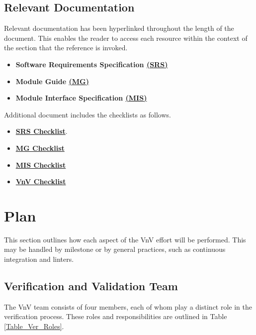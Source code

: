 \documentclass[12pt, titlepage]{article}
\begin{document}
\subsection{Relevant Documentation}
Relevant documentation has been hyperlinked throughout the length of the document. This enables 
the reader to access each resource within the context of the section that the reference is invoked.
\begin{itemize}
\item \textbf{Software Requirements Specification \href{https://github.com/KiranSingh15/CAS-741-Image-Correspondences/blob/main/docs/SRS/SRS.pdf}
{(SRS)}}
\item \textbf{Module Guide \href{https://github.com/KiranSingh15/CAS-741-Image-Correspondences/blob/main/docs/Design/SoftArchitecture/MG.pdf}
{(MG)}} 
\item 
\textbf{Module Interface Specification \href{https://github.com/KiranSingh15/CAS-741-Image-Correspondences/blob/main/docs/Design/SoftDetailedDes/MIS.pdf}{(MIS)}}
\end{itemize}

Additional document includes the checklists as follows.
\begin{itemize}
\item \textbf{\href{https://github.com/KiranSingh15/CAS-741-Image-Correspondences/blob/
main/docs/Checklists/SRS-Checklist.pdf}
{SRS Checklist}}. 
\item \textbf{\href{https://github.com/KiranSingh15/CAS-741-Image-Correspondences/blob/main/docs/Checklists/MG-Checklist.pdf}
{MG Checklist}} 
\item \textbf{\href{https://github.com/KiranSingh15/CAS-741-Image-Correspondences/blob/main/docs/Checklists/MIS-Checklist.pdf}{MIS Checklist}}
\item \textbf{\href{https://github.com/KiranSingh15/CAS-741-Image-Correspondences/blob/main/docs/Checklists/VnV-Checklist.pdf}
{VnV Checklist}}
\end{itemize}

\section{Plan}
This section outlines how each aspect of the VnV effort will be performed. This may be handled by 
milestone or by general practices, such as continuous integration and linters. 

\subsection{Verification and Validation Team}
The VnV team consists of four members, each of whom play a distinct role in the 
verification process. These roles and responsibilities are outlined in Table \ref{Table_Ver_Roles}.
\end{document}
